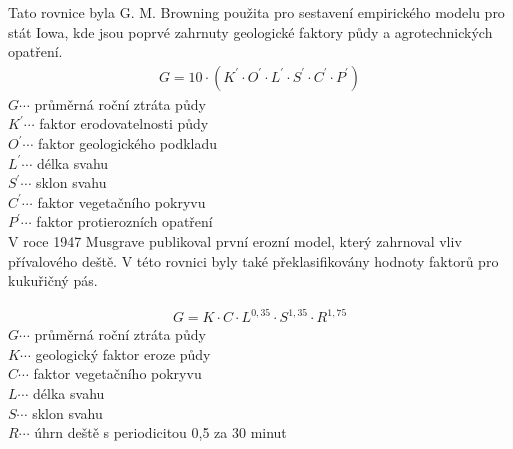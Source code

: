 Tato rovnice byla G. M. Browning použita pro sestavení empirického modelu pro stát Iowa, kde jsou poprvé zahrnuty geologické faktory půdy a agrotechnických opatření.
\begin{align}
   \label{browning} G=10\cdot\left( K^{\prime}\cdot O^{\prime}\cdot  L^{\prime}\cdot S^{\prime}\cdot C^{\prime}\cdot P^{\prime} \right)
\end{align}
\hspace*{2cm}$G \cdots$ průměrná roční ztráta půdy\\
\hspace*{2cm}$K^{\prime} \cdots$ faktor erodovatelnosti půdy \\ 
\hspace*{2cm}$O^{\prime} \cdots$ faktor geologického podkladu \\  
\hspace*{2cm}$L^{\prime} \cdots$ délka svahu \\ 
\hspace*{2cm}$S^{\prime} \cdots$ sklon svahu \\ 
\hspace*{2cm}$C^{\prime} \cdots$ faktor vegetačního pokryvu \\
\hspace*{2cm}$P^{\prime} \cdots$ faktor protierozních opatření \\

V roce 1947 Musgrave publikoval první erozní model, který zahrnoval vliv přívalového deště. V této rovnici byly také překlasifikovány hodnoty faktorů pro kukuřičný pás.

\begin{align}
   \label{musgrave1947} G=K\cdot C\cdot L^{0,35}\cdot S^{1,35}\cdot R^{1,75}
\end{align}
\hspace*{2cm}$G \cdots$ průměrná roční ztráta půdy\\
\hspace*{2cm}$K \cdots$ geologický faktor eroze půdy \\ 
\hspace*{2cm}$C \cdots$ faktor vegetačního pokryvu \\
\hspace*{2cm}$L \cdots$ délka svahu \\ 
\hspace*{2cm}$S \cdots$ sklon svahu \\  
\hspace*{2cm}$R \cdots$ úhrn deště s periodicitou 0,5 za 30 minut \\

